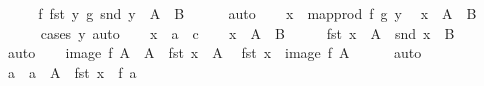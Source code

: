 \begin{isabellebody}
\ \ \isamarkupfalse%
\ \isamarkupfalse%
\ {\isachardoublequoteopen}{\isacharparenleft}{\kern0pt}f\ {\isacharparenleft}{\kern0pt}fst\ y{\isacharparenright}{\kern0pt}{\isacharcomma}{\kern0pt}\ g\ {\isacharparenleft}{\kern0pt}snd\ y{\isacharparenright}{\kern0pt}{\isacharparenright}{\kern0pt}\ {\isasymin}\ {\isacharparenleft}{\kern0pt}A{\isacharprime}{\kern0pt}\ {\isasymtimes}\ B{\isacharprime}{\kern0pt}{\isacharparenright}{\kern0pt}{\isachardoublequoteclose}\isanewline
\ \ \ \ \isamarkupfalse%
\ auto\isanewline
\ \ \isamarkupfalse%
\ {\isacartoucheopen}x\ {\isacharequal}{\kern0pt}\ map{\isacharunderscore}{\kern0pt}prod\ f\ g\ y{\isacartoucheclose}\ \isamarkupfalse%
\ {\isachardoublequoteopen}x\ {\isasymin}\ A{\isacharprime}{\kern0pt}\ {\isasymtimes}\ B{\isacharprime}{\kern0pt}{\isachardoublequoteclose}\isanewline
\ \ \ \ \isamarkupfalse%
\ {\isacharparenleft}{\kern0pt}cases\ y{\isacharparenright}{\kern0pt}\ auto\isanewline
{}\isamarkupfalse%
\isanewline
\ \ \isamarkupfalse%
\ x\ {\isacharcolon}{\kern0pt}{\isacharcolon}{\kern0pt}\ {\isachardoublequoteopen}{\isacharprime}{\kern0pt}a\ {\isasymtimes}\ {\isacharprime}{\kern0pt}c{\isachardoublequoteclose}\isanewline
\ \ \isamarkupfalse%
\ {\isachardoublequoteopen}x\ {\isasymin}\ A{\isacharprime}{\kern0pt}\ {\isasymtimes}\ B{\isacharprime}{\kern0pt}{\isachardoublequoteclose}\isanewline
\ \ \isamarkupfalse%
\ \isamarkupfalse%
\ {\isachardoublequoteopen}fst\ x\ {\isasymin}\ A{\isacharprime}{\kern0pt}{\isachardoublequoteclose}\ \ {\isachardoublequoteopen}snd\ x\ {\isasymin}\ B{\isacharprime}{\kern0pt}{\isachardoublequoteclose}\isanewline
\ \ \ \ \isamarkupfalse%
\ auto\isanewline
\ \ \isamarkupfalse%
\ {\isacartoucheopen}image\ f\ A\ {\isacharequal}{\kern0pt}\ A{\isacharprime}{\kern0pt}{\isacartoucheclose}\ \ {\isacartoucheopen}fst\ x\ {\isasymin}\ A{\isacharprime}{\kern0pt}{\isacartoucheclose}\ \isamarkupfalse%
\ {\isachardoublequoteopen}fst\ x\ {\isasymin}\ image\ f\ A{\isachardoublequoteclose}\isanewline
\ \ \ \ \isamarkupfalse%
\ auto\isanewline
\ \ \isamarkupfalse%
\ \isamarkupfalse%
\ a\ \ {\isachardoublequoteopen}a\ {\isasymin}\ A{\isachardoublequoteclose}\ \ {\isachardoublequoteopen}fst\ x\ {\isacharequal}{\kern0pt}\ f\ a{\isachardoublequoteclose}\isanewline
\ \ \ \ \isamarkupfalse%

\end{isabellebody}
